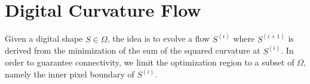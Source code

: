 \documentclass[runningheads]{llncs}
\begin{document}
\section{Digital Curvature Flow}

%	
%
%		
%
%
%

%





	Given a digital shape $S \in \Omega$, the idea is to evolve a flow $S^{(i)}$ where $S^{(i+1)}$ is derived from the minimization of the sum of the squared curvature at $S^{(i)}$. In order to guarantee connectivity, we limit the optimization region to a subset of $\Omega$, namely the inner pixel boundary of  $S^{(i)}$. 
\end{document}
